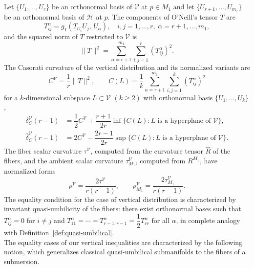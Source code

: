 \documentclass[11pt]{amsart}
\theoremstyle{plain}
\theoremstyle{definition}
\theoremstyle{remark}
\newcommand{\calH}{\mathcal{H}}
\newcommand{\calV}{\mathcal{V}}
\begin{document}
Let 
$\{U_1,\ldots,U_r\}$ be an orthonormal basis of $\calV$ 
at $p \in M_1$ and let $\{U_{r+1},\ldots,U_{m_1}\}$ be 
an orthonormal basis of $\calH$ at $p$. The components of 
O'Neill's tensor $T$ are
\begin{equation}\label{eq:T_components}
T_{ij}^{\alpha} = g_1(T_{U_i}U_j,\, U_\alpha), \quad 
i,j = 1,\ldots,r,\; \alpha = r+1,\ldots,m_1,
\end{equation}
and the squared norm of $T$ restricted to $\calV$ is
\begin{equation}\label{eq:T_norm}
\|T\|^2 = \sum_{\alpha=r+1}^{m_1}\sum_{i,j=1}^r 
           (T_{ij}^{\alpha})^2.
\end{equation}
The {Casorati curvature of the vertical distribution} 
and its normalized variants are
\begin{equation}\label{eq:casorati_vertical}
C^{\calV} = \dfrac{1}{r}\|T\|^2, \qquad
C(L) = \dfrac{1}{k}\sum_{\alpha=r+1}^{m_1}
        \sum_{i,j=1}^k (T_{ij}^{\alpha})^2
\end{equation}
for a $k$-dimensional subspace $L \subset \calV$ 
$(k \ge 2)$ with orthonormal basis $\{U_1,\ldots,U_k\}$,
\begin{align}
\delta_C^{\calV}(r-1) 
&= \dfrac{1}{2}C^{\calV} 
 + \dfrac{r+1}{2r}
   \inf\{C(L) : L \text{ is a hyperplane of } \calV\},
\label{eq:delta_casorati_vert}\\[4pt]
\hat{\delta}_C^{\calV}(r-1) 
&= 2C^{\calV} 
 - \dfrac{2r-1}{2r}
   \sup\{C(L) : L \text{ is a hyperplane of } \calV\}.
\label{eq:delta_hat_casorati_vert}
\end{align}
The fiber scalar curvature $\tau^{\calV}$, computed from 
the curvature tensor $\hat{R}$ of the fibers, and the 
ambient scalar curvature $\tau_{M_1}^{\calV}$, computed 
from $R^{M_1}$, have normalized forms
\begin{equation}\label{eq:normalized_scalar_vert}
\rho^{\calV} = \dfrac{2\tau^{\calV}}{r(r-1)}, \qquad
\rho_{M_1}^{\calV} 
= \dfrac{2\tau_{M_1}^{\calV}}{r(r-1)}.
\end{equation}
The equality condition for the case of vertical distribution is 
characterized by invariant quasi-umbilicity of the fibers: 
there exist orthonormal bases such that 
$T_{ij}^\alpha = 0$ for $i \neq j$ and 
$T_{11}^\alpha = \cdots = T_{r-1,r-1}^\alpha 
= \dfrac{1}{2}T_{rr}^\alpha$ for all $\alpha$, in complete 
analogy with Definition~\ref{def:quasi-umbilical}.\\

The equality cases of our vertical inequalities are characterized by the
following notion, which generalizes classical quasi-umbilical submanifolds to
the fibers of a submersion.
\end{document}
